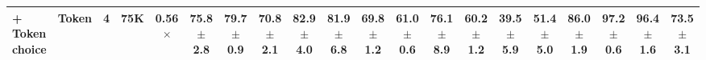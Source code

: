 {\begin{tabular}{l l c c c c c c c c c c c c c c c c c c}
\textbf{\quad + Token choice} & Token & 4 & 75K & 0.56$\times$ & 75.8{\scriptsize$\pm$2.8} & 79.7{\scriptsize$\pm$0.9} & 70.8{\scriptsize$\pm$2.1} & 82.9{\scriptsize$\pm$4.0} & 81.9{\scriptsize$\pm$6.8} & 69.8{\scriptsize$\pm$1.2} & 61.0{\scriptsize$\pm$0.6} & 76.1{\scriptsize$\pm$8.9} & 60.2{\scriptsize$\pm$1.2} & 39.5{\scriptsize$\pm$5.9} & \cellcolor{bestgreen}\textbf{51.4{\scriptsize$\pm$5.0}} & \cellcolor{bestgreen}\textbf{86.0{\scriptsize$\pm$1.9}} & 97.2{\scriptsize$\pm$0.6} & 96.4{\scriptsize$\pm$1.6} & 73.5{\scriptsize$\pm$3.1} \\
\bottomrule
\end{tabular}}
